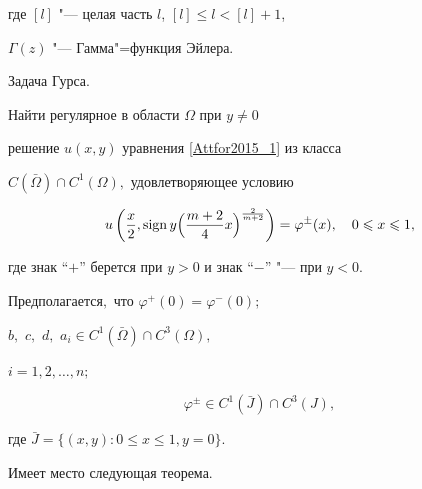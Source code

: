где $[l]$ "--- целая часть $l$, $[l]\leqslant l<[l]+1$, 

$\Gamma(z)$ "--- Гамма"=функция Эйлера.



\smallskip



{\small \sc Задача Гурса.} 

\it 

Найти регулярное в области $\Omega$ при $y\neq 0$ 

решение $u(x,y)$ уравнения \eqref{Attfor2015_1} из класса

$C(\bar{\Omega})\cap C^1(\Omega),$ удовлетворяющее условию

\begin{equation}

\label{Attfor2015_3}

u\left(\frac{x}{2}, \mathop{\rm sign} y \Bigl(\frac{m+2}{4} x\Bigr)^\frac{2}{m+2}\right)

=\varphi^{\pm} (x), \quad 0\leqslant x \leqslant 1,

\end{equation}

где знак ``$+$'' берется при $y>0$ и знак ``$-$'' "--- при $y<0$.









Предполагается$,$ что $\varphi^+(0)=\varphi^-(0);$

$

b,$ $ c,$ $ d,$  $a_i\in C^1(\bar{\Omega})\cap C^3(\Omega),$

$i=1, 2, \dots, n;$ 

\begin{equation}

\label{Attfor2015_4}

\varphi^\pm \in C^1(\bar{J})\cap C^3(J),

\end{equation}

где $ \bar J =\{( x, y ):  0 \leqslant x \leqslant 1, y=0\}.$







\smallskip



\rm



Имеет место следующая теорема.



